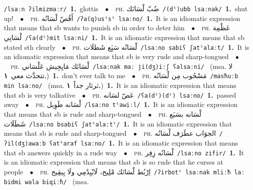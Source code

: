 \documentclass[10pt,a4paper,twoside]{article} %
\begin{document}
\begin{multicols}{2}
{{{{{{{{{{{{{{{{{{{{{{{{{{{{{{{{{{{{{{{{{{\color{gray}\texttt{/{\sffamily lsaːn ʔilmizmaːr}/}\color{black}}\ \textbf{1.}~glottis\ \ $\bullet$\ \ \textsc{ph.} \color{gray} \foreignlanguage{arabic}{ضُبّ لْسَانَك}\color{black}\ {\color{gray}\texttt{/{\sffamily (dˤ)ubb lsaːnak}/}\color{black}}\ \textbf{1.}~shut up!\ \ $\bullet$\ \ \textsc{ph.} \color{gray} \foreignlanguage{arabic}{أَقُصّ لْسَانُه}\color{black}\ {\color{gray}\texttt{/{\sffamily ʔa(q)usˤsˤ lsaːno}/}\color{black}}\ \textbf{1.}~It is an idiomatic expression that means that sb wants to punish sb in order to deter him\ \ $\bullet$\ \ \textsc{ph.} \color{gray} \foreignlanguage{arabic}{عَظْمِة لْسَانِي}\color{black}\ {\color{gray}\texttt{/{\sffamily ʕa(dˤ)mit lsaːni}/}\color{black}}\ \textbf{1.}~It is an idiomatic expression that means that sb stated sth clearly\ \ $\bullet$\ \ \textsc{ph.} \color{gray} \foreignlanguage{arabic}{لْسَانُه سَبَِع شَطلَات}\color{black}\ {\color{gray}\texttt{/{\sffamily lsaːno sabiʕ ʃatˤalaːt}/}\color{black}}\ \textbf{1.}~It is an idiomatic expression that means that sb is very rude and sharp-tongued\ \ $\bullet$\ \ \textsc{ph.} \color{gray} \foreignlanguage{arabic}{لْسَانَك مَايِجِيش عَلْسَاني}\color{black}\ {\color{gray}\texttt{/{\sffamily lsaːnak maː ji(dʒ)iːʃ ʕalsaːni}/}\color{black}}\ \color{gray} (msa. \foreignlanguage{arabic}{لا تتحدَّث معي}~\foreignlanguage{arabic}{\textbf{١.}})\color{black}\ \textbf{1.}~don't ever talk to me\ \ $\bullet$\ \ \textsc{ph.} \color{gray} \foreignlanguage{arabic}{مَسْحُوب مِن لْسَانُه}\color{black}\ {\color{gray}\texttt{/{\sffamily masħuːb min lsaːno}/}\color{black}}\ \color{gray} (msa. \foreignlanguage{arabic}{ثرثار جداً}~\foreignlanguage{arabic}{\textbf{١.}})\color{black}\ \textbf{1.}~It is an idiomatic expression that means that sb is very talkative\ \ $\bullet$\ \ \textsc{ph.} \color{gray} \foreignlanguage{arabic}{عَضّ لسَانه}\color{black}\ {\color{gray}\texttt{/{\sffamily ʕa(dˤ)(dˤ) lsaːno}/}\color{black}}\ \textbf{1.}~passed away\ \ $\bullet$\ \ \textsc{ph.} \color{gray} \foreignlanguage{arabic}{لْسَانه طَوِيل}\color{black}\ {\color{gray}\texttt{/{\sffamily lsaːno tˤawiːl}/}\color{black}}\ \textbf{1.}~It is an idiomatic expression that means that sb is rude and sharp-tongued\ \ $\bullet$\ \ \textsc{ph.} \color{gray} \foreignlanguage{arabic}{لْسَانه بسَبَع شَطَلَات}\color{black}\ {\color{gray}\texttt{/{\sffamily lsaːno bsabiʕ ʃatˤalaːtˤ}/}\color{black}}\ \textbf{1.}~It is an idiomatic expression that means that sb is rude and sharp-tongued\ \ $\bullet$\ \ \textsc{ph.} \color{gray} \foreignlanguage{arabic}{الجوَاب عطَرَف لْسَانُه}\color{black}\ {\color{gray}\texttt{/{\sffamily ʔil(dʒ)awaːb ʕatˤaraf lsaːno}/}\color{black}}\ \textbf{1.}~It is an idiomatic expression that means that sb answers quickly in a rude way\ \ $\bullet$\ \ \textsc{ph.} \color{gray} \foreignlanguage{arabic}{لْسَانُه زِفِر}\color{black}\ {\color{gray}\texttt{/{\sffamily lsaːno zifir}/}\color{black}}\ \textbf{1.}~It is an idiomatic expression that means that sb is so rude that he curses at people\ \ $\bullet$\ \ \textsc{ph.} \color{gray} \foreignlanguage{arabic}{اِرْبُط لْسَانَك مْلِيح، لَابْيِدْمِي ولَا بِيقِيح}\color{black}\ {\color{gray}\texttt{/{\sffamily ʔirbotˤ lsaːnak mliːħ laː bidmi wala biqiːħ}/}\color{black}}\ \color{gray} (msa. }}}}}}}}}}}}}}}}}}}}}}}}}}}}}}}}}}}}}}}}}
\end{multicols}
\end{document}
